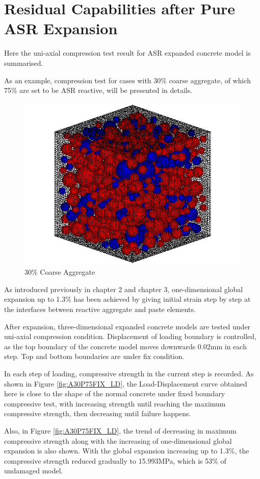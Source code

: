 \clearpage

\section{Residual Capabilities after Pure ASR Expansion}

Here the uni-axial compression test result for ASR expanded concrete model is summarised.

As an example, compression test for cases with 30\% coarse aggregate, of which 75\% are set to be ASR reactive, will be presented in details.

\begin{figure}[ht!]
\centering
\includegraphics[width=.3\linewidth]{Files/Aggregate/A30P75.png}
  \caption{30\% Coarse Aggregate}
  \label{fig:A30P75_model}
\end{figure}

As introduced previously in chapter 2 and chapter 3, one-dimensional global expansion up to 1.3\% has been achieved by giving initial strain step by step at the interfaces between reactive aggregate and paste elements.

After expansion, three-dimensional expanded concrete models are tested under uni-axial compression condition. Displacement of loading boundary is controlled, as the top boundary of the concrete model moves downwards 0.02mm in each step. Top and bottom boundaries are under fix condition.

In each step of loading, compressive strength in the current step is recorded. As shown in Figure \ref{fig:A30P75FIX_LD}, the Load-Displacement curve obtained here is close to the shape of the normal concrete under fixed boundary compressive test, with increasing strength until reaching the maximum compressive strength, then decreasing until failure happens.

Also, in Figure \ref{fig:A30P75FIX_LD}, the trend of decreasing in maximum compressive strength along with the increasing of one-dimensional global expansion is also shown. With the global expansion increasing up to 1.3\%, the compressive strength reduced gradually to 15.993MPa, which is 53\% of undamaged model.

